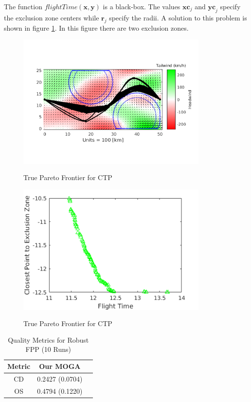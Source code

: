 \documentclass{article}
\begin{document}
\noindent The function $flightTime(\textbf{x},\textbf{y})$ is a black-box. The values $\textbf{xc}_j$ and  $\textbf{yc}_j$ specify the exclusion zone centers while $\textbf{r}_j$ specify the radii. A solution to this problem is shown in figure \ref{fig:FPP}.  In this figure there are two exclusion zones.
\begin{figure}[H]
  \caption{True Pareto Frontier for CTP}
  \centering
  \includegraphics[width=0.85\textwidth]{FPP.png}  
  \label{fig:FPP}
\end{figure}
	
\begin{figure}[H]
  \caption{True Pareto Frontier for CTP}
  \centering
  \includegraphics[width=0.85\textwidth]{FPP_pareto.png}  
  \label{fig:FPP_pareto}
\end{figure}

\begin{table}[H]
\caption{Quality Metrics for Robust FPP (10 Runs)} 
\centering 
\begin{tabular}{|c|c|c|} 
\hline\hline  
Metric &  Our MOGA \\ \hline
CD & 0.2427 (0.0704) \\ \hline
OS & 0.4794 (0.1220) \\ \hline
\end{tabular}
\label{tab:robustTNK} 
\end{table}
\end{document}
